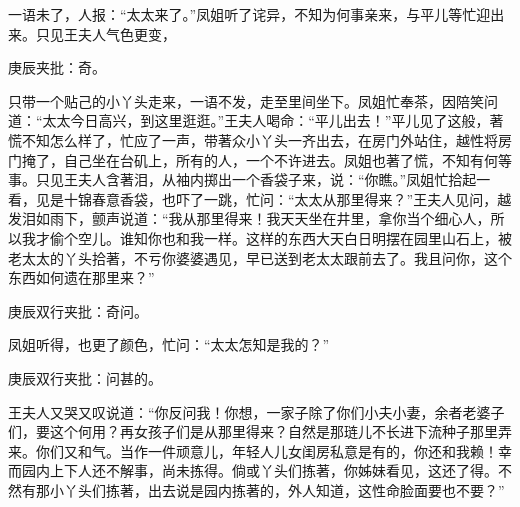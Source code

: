 \begin{parag}
    一语未了，人报：“太太来了。”凤姐听了诧异，不知为何事亲来，与平儿等忙迎出来。只见王夫人气色更变，\begin{note}庚辰夹批：奇。\end{note}只带一个贴己的小丫头走来，一语不发，走至里间坐下。凤姐忙奉茶，因陪笑问道：“太太今日高兴，到这里逛逛。”王夫人喝命：“平儿出去！”平儿见了这般，著慌不知怎么样了，忙应了一声，带著众小丫头一齐出去，在房门外站住，越性将房门掩了，自己坐在台矶上，所有的人，一个不许进去。凤姐也著了慌，不知有何等事。只见王夫人含著泪，从袖内掷出一个香袋子来，说：“你瞧。”凤姐忙拾起一看，见是十锦春意香袋，也吓了一跳，忙问：“太太从那里得来？”王夫人见问，越发泪如雨下，颤声说道：“我从那里得来！我天天坐在井里，拿你当个细心人，所以我才偷个空儿。谁知你也和我一样。这样的东西大天白日明摆在园里山石上，被老太太的丫头拾著，不亏你婆婆遇见，早已送到老太太跟前去了。我且问你，这个东西如何遗在那里来？”\begin{note}庚辰双行夹批：奇问。\end{note}凤姐听得，也更了颜色，忙问：“太太怎知是我的？”\begin{note}庚辰双行夹批：问甚的。\end{note}王夫人又哭又叹说道：“你反问我！你想，一家子除了你们小夫小妻，余者老婆子们，要这个何用？再女孩子们是从那里得来？自然是那琏儿不长进下流种子那里弄来。你们又和气。当作一件顽意儿，年轻人儿女闺房私意是有的，你还和我赖！幸而园内上下人还不解事，尚未拣得。倘或丫头们拣著，你姊妹看见，这还了得。不然有那小丫头们拣著，出去说是园内拣著的，外人知道，这性命脸面要也不要？”
\end{parag}



